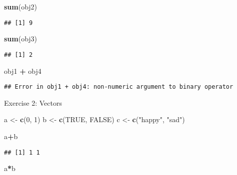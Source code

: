 \documentclass[
]{article}
\newenvironment{Shaded}{\begin{snugshade}}{\end{snugshade}}
\newcommand{\ConstantTok}[1]{\textcolor[rgb]{0.56,0.35,0.01}{#1}}
\newcommand{\DecValTok}[1]{\textcolor[rgb]{0.00,0.00,0.81}{#1}}
\newcommand{\FunctionTok}[1]{\textcolor[rgb]{0.13,0.29,0.53}{\textbf{#1}}}
\newcommand{\NormalTok}[1]{#1}
\newcommand{\OtherTok}[1]{\textcolor[rgb]{0.56,0.35,0.01}{#1}}
\newcommand{\SpecialCharTok}[1]{\textcolor[rgb]{0.81,0.36,0.00}{\textbf{#1}}}
\newcommand{\StringTok}[1]{\textcolor[rgb]{0.31,0.60,0.02}{#1}}
\begin{document}
\begin{Shaded}
\begin{Highlighting}[]
\FunctionTok{sum}\NormalTok{(obj2)}
\end{Highlighting}
\end{Shaded}

\begin{verbatim}
## [1] 9
\end{verbatim}

\begin{Shaded}
\begin{Highlighting}[]
\FunctionTok{sum}\NormalTok{(obj3)}
\end{Highlighting}
\end{Shaded}

\begin{verbatim}
## [1] 2
\end{verbatim}

\begin{Shaded}
\begin{Highlighting}[]
\NormalTok{obj1 }\SpecialCharTok{+}\NormalTok{ obj4}
\end{Highlighting}
\end{Shaded}

\begin{verbatim}
## Error in obj1 + obj4: non-numeric argument to binary operator
\end{verbatim}

Exercise 2: Vectors

\begin{Shaded}
\begin{Highlighting}[]
\NormalTok{a }\OtherTok{\textless{}{-}} \FunctionTok{c}\NormalTok{(}\DecValTok{0}\NormalTok{, }\DecValTok{1}\NormalTok{)}
\NormalTok{b }\OtherTok{\textless{}{-}} \FunctionTok{c}\NormalTok{(}\ConstantTok{TRUE}\NormalTok{, }\ConstantTok{FALSE}\NormalTok{)}
\NormalTok{c }\OtherTok{\textless{}{-}} \FunctionTok{c}\NormalTok{(}\StringTok{"happy"}\NormalTok{, }\StringTok{"sad"}\NormalTok{)}

\NormalTok{a}\SpecialCharTok{+}\NormalTok{b}
\end{Highlighting}
\end{Shaded}

\begin{verbatim}
## [1] 1 1
\end{verbatim}

\begin{Shaded}
\begin{Highlighting}[]
\NormalTok{a}\SpecialCharTok{*}\NormalTok{b}
\end{Highlighting}
\end{Shaded}
\end{document}
